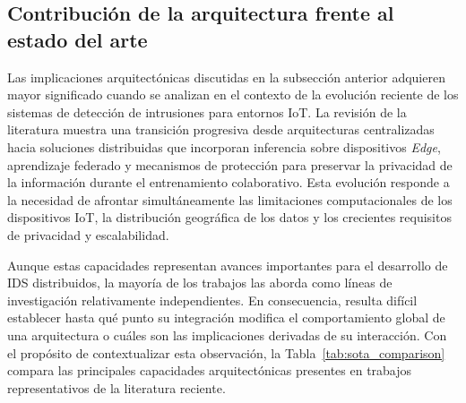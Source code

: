 \documentclass[journal,article,submit,moreauthors]{Definitions/mdpi}
\begin{document}
\subsection{Contribución de la arquitectura frente al estado del arte}
Las implicaciones arquitectónicas discutidas en la subsección anterior adquieren mayor significado cuando se analizan en el contexto de la evolución reciente de los sistemas de detección de intrusiones para entornos IoT. La revisión de la literatura muestra una transición progresiva desde arquitecturas centralizadas hacia soluciones distribuidas que incorporan inferencia sobre dispositivos \textit{Edge}, aprendizaje federado y mecanismos de protección para preservar la privacidad de la información durante el entrenamiento colaborativo. Esta evolución responde a la necesidad de afrontar simultáneamente las limitaciones computacionales de los dispositivos IoT, la distribución geográfica de los datos y los crecientes requisitos de privacidad y escalabilidad.

Aunque estas capacidades representan avances importantes para el desarrollo de IDS distribuidos, la mayoría de los trabajos las aborda como líneas de investigación relativamente independientes. En consecuencia, resulta difícil establecer hasta qué punto su integración modifica el comportamiento global de una arquitectura o cuáles son las implicaciones derivadas de su interacción. Con el propósito de contextualizar esta observación, la Tabla~\ref{tab:sota_comparison} compara las principales capacidades arquitectónicas presentes en trabajos representativos de la literatura reciente.
\end{document}
